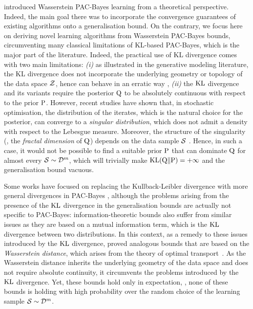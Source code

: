 introduced Wasserstein PAC-Bayes learning from a theoretical perspective. Indeed, the main goal there was to incorporate the convergence guarantees of existing algorithms onto a generalisation bound. On the contrary, we focus here on deriving novel learning algorithms from Wasserstein PAC-Bayes bounds, circumventing many classical limitations of KL-based PAC-Bayes, which is the major part of the literature. Indeed, the practical use of KL divergence comes with two main limitations: {\it (i)} as illustrated in the generative modeling literature, the KL divergence does not incorporate the underlying geometry or topology of the data space $\Z$, hence can behave in an erratic way \cite{arjovsky2017wasserstein},
{\it (ii)} the $\KL$ divergence and its variants require the posterior $\Q$ to be absolutely continuous with respect to the prior $\P$.
However, recent studies \citep{camuto2021fractal} have shown that, in stochastic optimisation, the distribution of the iterates, which is the natural choice for the posterior, can converge to a \emph{singular distribution}, which does not admit a density with respect to the Lebesgue measure.
Moreover, the structure of the singularity (\ie, the \emph{fractal dimension} of $\Q$) depends on the data sample $\S$ \citep{camuto2021fractal}. 
Hence, in such a case, it would not be possible to find a suitable prior $\P$ that can dominate $\Q$ for almost every $\S \sim \D^m$, which will trivially make $\KL(\Q\|\P) = +\infty$ and the generalisation bound vacuous. 

Some works have focused on replacing the Kullback-Leibler divergence with more general divergences in PAC-Bayes \citep{alquier2018simpler,ohnishi2021novel,picard2022change}, although the problems arising from the presence of the $\KL$ divergence in the generalisation bounds are actually not specific to PAC-Bayes: information-theoretic bounds \citep{goyal2017pac,xu2017info,russo2020how} also suffer from similar issues as they are based on a mutual information term, which is the $\KL$ divergence between two distributions.
In this context, as a remedy to these issues introduced by the $\KL$ divergence, \cite{zhang2018optimal,wang2019information,rodriguez2021tighter,lugosi2022generalization} proved analogous bounds that are based on the \emph{Wasserstein distance}, which arises from the theory of optimal transport~\cite{monge1781memoire}.
As the Wasserstein distance inherits the underlying geometry of the data space and does not require absolute continuity, it circumvents the problems introduced by the $\KL$ divergence.
Yet, these bounds hold only in expectation, \ie, none of these bounds is holding with high probability over the random choice of the learning sample $\S\sim\D^{m}$.

